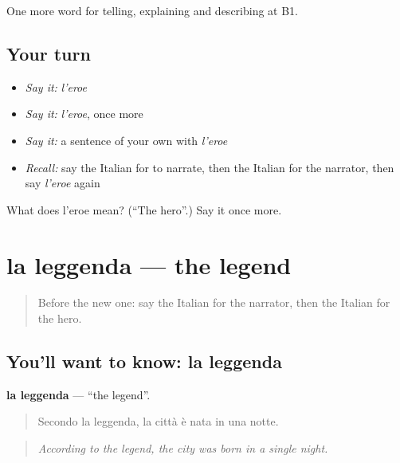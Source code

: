 \begin{grammarlens}[title={What you've built}]
One more word for telling, explaining and describing at B1.
\end{grammarlens}

\subsection*{Your turn}
\begin{itemize}
\raggedright
  \item \emph{Say it:} \emph{l'eroe}
  \item \emph{Say it:} \emph{l'eroe}, once more
  \item \emph{Say it:} a sentence of your own with \emph{l'eroe}
  \item \emph{Recall:} say the Italian for to narrate, then the Italian for the narrator, then say \emph{l'eroe} again
\end{itemize}

\begin{tcolorbox}[breakable,colback=teal!4,colframe=teal!35!black,title={Before you move on}]
What does l'eroe mean? (\textquotedblleft{}The hero\textquotedblright{}.) Say it once more.
\end{tcolorbox}
\section[la leggenda]{la leggenda — the legend}

\label{lesson:IT-C324-leggenda}



\begin{quote}
Before the new one: say the Italian for the narrator, then the Italian for the hero.
\end{quote}

\subsection*{You'll want to know: la leggenda}
\textbf{la leggenda} — \textquotedblleft{}the legend\textquotedblright{}.

\begin{quote}
Secondo la leggenda, la città è nata in una notte.
\end{quote}

\begin{quote}
\emph{According to the legend, the city was born in a single night.}
\end{quote}

